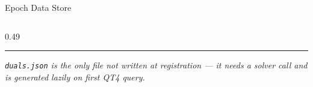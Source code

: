 \documentclass[aspectratio=169,10pt]{beamer}
\begin{document}
\begin{frame}[t]{Epoch Data Store}
\begin{columns}[T]
\begin{column}{0.49\textwidth}
\begin{center}
    \end{center}
    \vspace{2pt}
    \textcolor{aorng}{\rule[0.4ex]{0.25cm}{0.7pt}}\;
    \textcolor{aorng}{\scriptsize\textit{\texttt{duals.json} is the only file not written at registration — it needs a solver call and is generated lazily on first QT4 query.}}
  \end{column}
\end{columns}
\end{frame}
\end{document}
